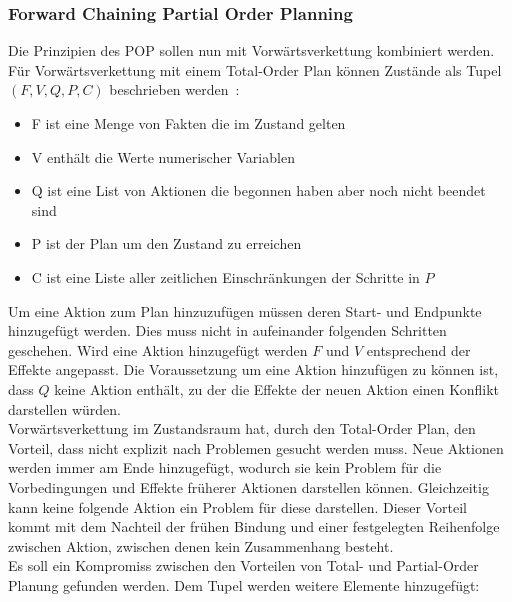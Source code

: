 \subsubsection{Forward Chaining Partial Order Planning}
Die Prinzipien des \ac{POP} sollen nun mit Vorwärtsverkettung kombiniert werden.
Für Vorwärtsverkettung mit einem Total-Order Plan können Zustände als Tupel $(F,V,Q,P,C)$ beschrieben werden~\citep{popf}:
\begin{itemize}
    \item F ist eine Menge von Fakten die im Zustand gelten
    \item V enthält die Werte numerischer Variablen
    \item Q ist eine List von Aktionen die begonnen haben aber noch nicht beendet sind
    \item P ist der Plan um den Zustand zu erreichen
    \item C ist eine Liste aller zeitlichen Einschränkungen der Schritte in $P$
\end{itemize}
Um eine Aktion zum Plan hinzuzufügen müssen deren Start- und Endpunkte hinzugefügt werden.
Dies muss nicht in aufeinander folgenden Schritten geschehen.
Wird eine Aktion hinzugefügt werden $F$ und $V$ entsprechend der Effekte angepasst.
Die Voraussetzung um eine Aktion hinzufügen zu können ist, dass $Q$ keine Aktion enthält, zu der die Effekte der neuen Aktion einen Konflikt darstellen würden.\\
Vorwärtsverkettung im Zustandsraum hat, durch den Total-Order Plan, den Vorteil, dass nicht explizit nach Problemen gesucht werden muss.
Neue Aktionen werden immer am Ende hinzugefügt, wodurch sie kein Problem für die Vorbedingungen und Effekte früherer Aktionen darstellen können.
Gleichzeitig kann keine folgende Aktion ein Problem für diese darstellen.
Dieser Vorteil kommt mit dem Nachteil der frühen Bindung und einer festgelegten Reihenfolge zwischen Aktion, zwischen denen kein Zusammenhang besteht.\\
Es soll ein Kompromiss zwischen den Vorteilen von Total- und Partial-Order Planung gefunden werden.
Dem Tupel werden weitere Elemente hinzugefügt:
